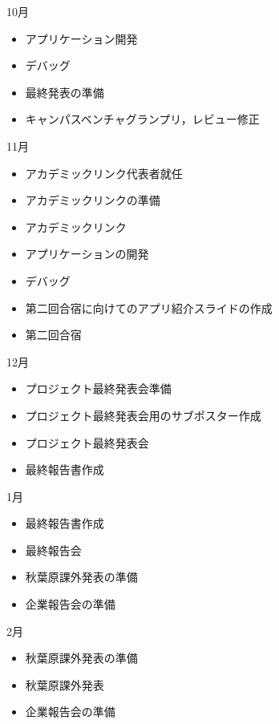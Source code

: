 10月
\begin{itemize}
\item アプリケーション開発
\item デバッグ
\item 最終発表の準備
\item キャンパスベンチャグランプリ，レビュー修正
\end{itemize}
11月
\begin{itemize}
\item アカデミックリンク代表者就任
\item アカデミックリンクの準備
\item アカデミックリンク
\item アプリケーションの開発
\item デバッグ
\item 第二回合宿に向けてのアプリ紹介スライドの作成
\item 第二回合宿
\end{itemize}
12月
\begin{itemize}
\item プロジェクト最終発表会準備
\item プロジェクト最終発表会用のサブポスター作成
\item プロジェクト最終発表会
\item 最終報告書作成
\end{itemize}
1月
\begin{itemize}
\item 最終報告書作成
\item 最終報告会
\item 秋葉原課外発表の準備
\item 企業報告会の準備
\end{itemize}
2月
\begin{itemize}
\item 秋葉原課外発表の準備
\item 秋葉原課外発表
\item 企業報告会の準備
\end{itemize}
